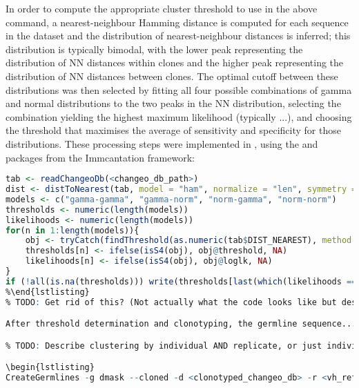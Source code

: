 In order to compute the appropriate cluster threshold to use in the above command, a nearest-neighbour Hamming distance is computed for each sequence in the dataset and the distribution of nearest-neighbour distances is inferred; this distribution is typically bimodal, with the lower peak representing the distribution of NN distances within clones and the higher peak representing the distribution of NN distances between clones. The optimal cutoff between these distributions was then selected by fitting all four possible combinations of gamma and normal distributions to the two peaks in the NN distribution, selecting the combination yielding the highest maximum likelihood (typically ...), %
and choosing the threshold that maximises the average of sensitivity and specificity for those distributions. These processing steps were implemented in , using the  and  packages from the Immcantation framework: %

\begin{lstlisting}[language=R]
tab <- readChangeoDb(<changeo_db_path>)
dist <- distToNearest(tab, model = "ham", normalize = "len", symmetry = "min", fields = "INDIVIDUAL")
models <- c("gamma-gamma", "gamma-norm", "norm-gamma", "norm-norm")
thresholds <- numeric(length(models))
likelihoods <- numeric(length(models))
for(n in 1:length(models)){
	obj <- tryCatch(findThreshold(as.numeric(tab$DIST_NEAREST), method = "gmm", model = "hmm", cutoff = "opt"), error = function(e) return(e$message), warning = function(w) return(w$message))
	thresholds[n] <- ifelse(isS4(obj), obj@threshold, NA)
	likelihoods[n] <- ifelse(isS4(obj), obj@loglk, NA)
}
if (!all(is.na(thresholds))) write(thresholds[last(which(likelihoods == max(likelihoods, na.rm = TRUE))], <threshold_output_path>)
%\end{lstlisting} 

After threshold determination and clonotyping, the germline sequence... %


\begin{lstlisting}
CreateGermlines -g dmask --cloned -d <clonotyped_changeo_db> -r <vh_reference_fasta> <dh_reference_fasta> <jh_reference_fasta> --failed
\end{lstlisting}

